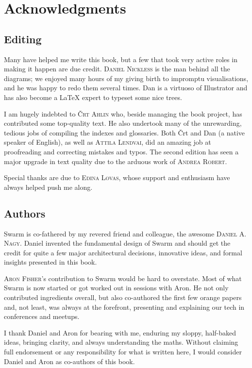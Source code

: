 \newcommand{\person}[1]{{\scshape #1}}
\chapter{Acknowledgments \statusgreen}

\section*{Editing}

Many have helped me write this book, but a few that took very active roles in making it happen are due credit. \person{Daniel Nickless} is the man behind all the diagrams; we enjoyed many hours of my giving birth to impromptu visualisations, and he was happy to redo them several times. Dan is a virtuoso of Illustrator and has also become a LaTeX expert to typeset some nice trees. 

I am hugely indebted to \person{Črt Ahlin} who, beside managing the book project, has contributed some top-quality text.
He also undertook many of the unrewarding, tedious jobs of compiling the indexes and glossaries. Both Črt and Dan (a native speaker of English), as well as \person{Attila Lendvai}, did an amazing job at proofreading and correcting mistakes and typos.
The second edition has seen a major upgrade in text quality due to the arduous work of \person{Andrea Robert}.

Special thanks are due to \person{Edina Lovas}, whose support and enthusiasm have always helped push me along. 

\section*{Authors}

Swarm is co-fathered by my revered friend and colleague, the awesome \person{Daniel A. Nagy}.  Daniel invented the fundamental design of Swarm and should get the credit for quite a few major architectural decisions, innovative ideas, and formal insights presented in this book. 

\person{Aron Fisher}'s contribution to Swarm would be hard to overstate. Most of what Swarm is now started or got worked out in sessions with Aron.  He not only contributed ingredients overall, but also co-authored the first few orange papers and, not least, was always at the forefront, presenting and explaining our tech in conferences and meetups.

I thank Daniel and Aron for bearing with me, enduring my sloppy, half-baked ideas, bringing clarity, and always understanding the maths.
Without claiming full endorsement or any responsibility for what is written here,
I would consider Daniel and Aron as co-authors of this book.

